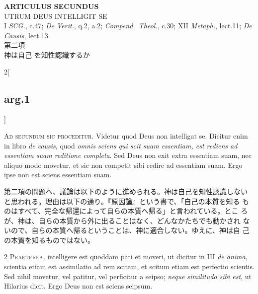\documentclass[paper=a4paper,fontsize=10pt,jafontsize=9pt,titlepage]{jlreq}
\begin{document}
\newpage

{}
\setcounter{section}{2}
\setcounter{subsection}{0}
\begin{center}
{\Large {\bfseries ARTICULUS SECUNDUS}}\\ {\large UTRUM DEUS INTELLIGIT
SE}\\ {\footnotesize I {\itshape SCG.}, c.47; {\itshape De Verit.},
q.2, a.2; {\itshape Compend.~Theol.}, c.30; XII {\itshape Metaph.},
lect.11; {\itshape De Causis}, lect.13.}\\ {\Large 第二項\\神は自己
を知性認識するか}
\end{center}



\begin{paracol}{2}[\subsection{arg.1}]

{\huge A}{\scshape d secundum sic proceditur}. Videtur quod Deus non
intelligat se. Dicitur enim in libro {\itshape de causis}, quod
{\itshape omnis sciens qui scit suam essentiam, est rediens ad
essentiam suam reditione completa}. Sed Deus non exit extra essentiam
suam, nec aliquo modo movetur, et sic non competit sibi redire ad
essentiam suam. Ergo ipse non est sciens essentiam suam.

\switchcolumn

第二項の問題へ、議論は以下のように進められる。神は自己を知性認識しない
と思われる。理由は以下の通り。『原因論』という書で、「自己の本質を知る
ものはすべて、完全な帰還によって自らの本質へ帰る」と言われている。とこ
ろが、神は、自らの本質から外に出ることはなく、どんなかたちでも動かされ
ないので、自らの本質へ帰るということは、神に適合しない。ゆえに、神は自
己の本質を知るものではない。


{\scshape 2 Praeterea}, intelligere est quoddam pati et moveri, ut
dicitur in III {\itshape de anima}, scientia etiam est assimilatio ad
rem scitam, et scitum etiam est perfectio scientis. Sed nihil movetur,
vel patitur, vel perficitur a seipso; {\itshape neque similitudo sibi
est}, ut Hilarius dicit. Ergo Deus non est sciens seipsum.


\end{paracol}
\end{document}
